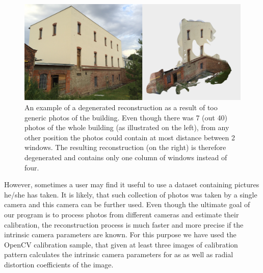 \begin{figure}[ht]
	\begin{center}
		\includegraphics[keepaspectratio,width=\textwidth]{fig/degenerated-dataset.pdf}
	\end{center}
	\caption{An example of a degenerated reconstruction as a result of too generic photos of the building. Even though there was 7 (out 40)  photos of the whole building (as illustrated on the left), from any other position the photos could contain at most distance between 2 windows. The resulting reconstruction (on the right) is therefore degenerated and contains only one column of windows instead of four.}
	\label{fig:degenerated-dataset}
\end{figure}

However, sometimes a user may find it useful to use a dataset containing pictures he/she has taken. It is likely, that such collection of photos was taken by a single camera and this camera can be further used. Even though the ultimate goal of our program is to process photos from different cameras and estimate their calibration, the reconstruction process is much faster and more precise if the intrinsic camera parameters are known. For this purpose we have used the OpenCV calibration sample, that given at least three images of calibration pattern calculates the intrinsic camera parameters for as as well as radial distortion coefficients of the image.

